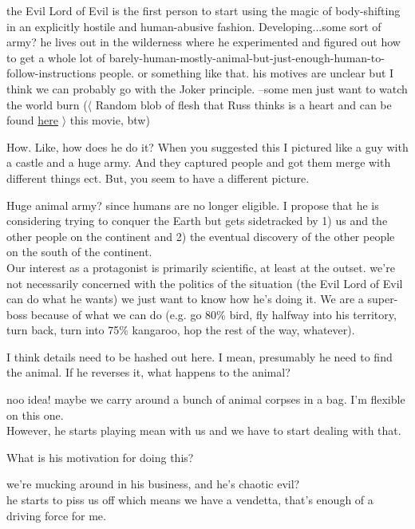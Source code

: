 the Evil Lord of Evil is the first person to start using the magic of body-shifting in an explicitly hostile and human-abusive fashion.  Developing...some sort of army? he lives out in the wilderness where he experimented and figured out how to get a whole lot of barely-human-mostly-animal-but-just-enough-human-to-follow-instructions people.  or something like that.  his motives are unclear but I think we can probably go with the Joker principle. --some men just want to watch the world burn ($\langle$ Random blob of flesh that Russ thinks is a heart and can be found \href{http://fatnewsfeed.com/wordpress/wp-content/uploads/2010/10/heart\_cropped.jpg}{here} $\rangle$ this movie, btw) 

\A How. Like, how does he do it? When you suggested this I pictured like a guy with a castle and a huge army. And they captured people and got them merge with different things ect. But, you seem to have a different picture. 

\R Huge animal army? since humans are no longer eligible.  I propose that he is considering trying to conquer the Earth but gets sidetracked by 1) us and the other people on the continent and 2) the eventual discovery of the other people on the south of the continent. \\

Our interest as a protagonist is primarily scientific, at least at the outset.  we're not necessarily concerned with the politics of the situation (the Evil Lord of Evil can do what he wants) we just want to know how he's doing it.  We are a super-boss because of what we can do (e.g. go 80\% bird, fly halfway into his territory, turn back, turn into 75\% kangaroo, hop the rest of the way, whatever).  

\A I think details need to be hashed out here. I mean, presumably he need to find the animal. If he reverses it, what happens to the animal?

\R noo idea! maybe we carry around a bunch of animal corpses in a bag. I'm flexible on this one. \\

However, he starts playing mean with us and we have to start dealing with that.  

\A What is his motivation for doing this?

\R we're mucking around in his business, and he's chaotic evil? \\

he starts to piss us off which means we have a vendetta, that's enough of a driving force for me. \\

